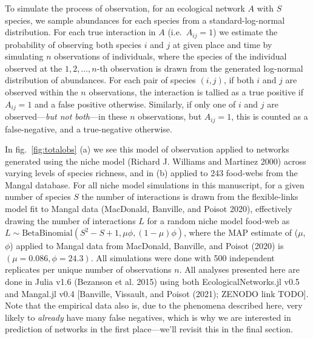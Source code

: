 \documentclass[10pt,oneside]{article}
\begin{document}
To simulate the process of observation, for an ecological network \(A\)
with \(S\) species, we sample abundances for each species from a
standard-log-normal distribution. For each true interaction in \(A\)
(i.e.~\(A_{ij} = 1\)) we estimate the probability of observing both
species \(i\) and \(j\) at given place and time by simulating \(n\)
observations of individuals, where the species of the individual
observed at the \(1,2,\dots,n\)-th observation is drawn from the
generated log-normal distribution of abundances. For each pair of
species \((i,j)\), if both \(i\) and \(j\) are observed within the \(n\)
observations, the interaction is tallied as a true positive if
\(A_{ij}=1\) and a false positive otherwise. Similarly, if only one of
\(i\) and \(j\) are observed---\emph{but not both}---in these \(n\)
observations, but \(A_{ij}=1\), this is counted as a false-negative, and
a true-negative otherwise.

In fig.~\ref{fig:totalobs} (a) we see this model of observation applied
to networks generated using the niche model (Richard J. Williams and
Martinez 2000) across varying levels of species richness, and in (b)
applied to 243 food-webs from the Mangal database. For all niche model
simulations in this manuscript, for a given number of species \(S\) the
number of interactions is drawn from the flexible-links model fit to
Mangal data (MacDonald, Banville, and Poisot 2020), effectively drawing
the number of interactions \(L\) for a random niche model food-web as
\(L \sim \text{BetaBinomial}(S^2-S+1, \mu \phi, (1-\mu)\phi)\), where
the MAP estimate of (\(\mu\), \(\phi\)) applied to Mangal data from
MacDonald, Banville, and Poisot (2020) is \((\mu = 0.086, \phi =24.3)\).
All simulations were done with 500 independent replicates per unique
number of observations \(n\). All analyses presented here are done in
Julia v1.6 (Bezanson et al. 2015) using both EcologicalNetworks.jl v0.5
and Mangal.jl v0.4 {[}Banville, Vissault, and Poisot (2021); ZENODO link
TODO{]}. Note that the empirical data also is, due to the phenomena
described here, very likely to \emph{already} have many false negatives,
which is why we are interested in prediction of networks in the first
place---we'll revisit this in the final section.
\end{document}
